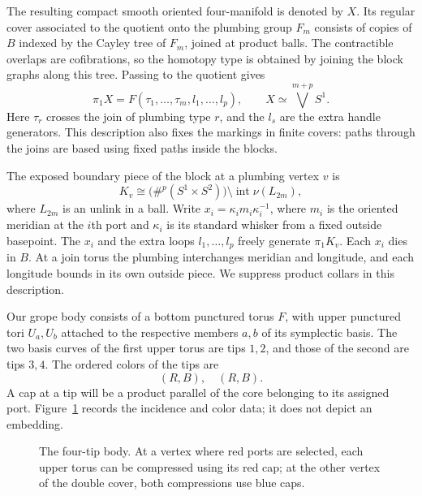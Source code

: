 The resulting compact smooth oriented four-manifold is denoted by $X$.
Its regular cover associated to the quotient onto the plumbing group
$F_m$ consists of copies of $B$ indexed by the Cayley tree of $F_m$,
joined at product balls.  The contractible overlaps are cofibrations,
so the homotopy type is obtained by joining the block graphs along
this tree.  Passing to the quotient gives
\begin{equation}
\label{ch:plumbing-group}
 \pi_1X=F(\tau_1,\ldots,\tau_m,l_1,\ldots,l_p),
 \qquad X\simeq\bigvee^{m+p}S^1.
\end{equation}
Here $\tau_r$ crosses the join of plumbing type $r$, and the $l_s$ are
the extra handle generators.  This description also fixes the markings
in finite covers: paths through the joins are based using fixed paths
inside the blocks.

The exposed boundary piece of the block at a plumbing vertex $v$ is
\begin{equation}
\label{ch:outside-piece}
 K_v\cong\bigl(\#^p(S^1\times S^2)\bigr)
       \setminus\operatorname{int}\nu(L_{2m}),
\end{equation}
where $L_{2m}$ is an unlink in a ball.  Write
$x_i=\kappa_i m_i\kappa_i^{-1}$, where $m_i$ is the oriented meridian
at the $i$th port and $\kappa_i$ is its standard whisker from a fixed
outside basepoint.  The $x_i$ and the extra loops
$l_1,\ldots,l_p$ freely generate $\pi_1K_v$.  Each $x_i$ dies in $B$.
At a join torus the plumbing interchanges meridian and longitude, and
each longitude bounds in its own outside piece.  We suppress product
collars in this description.

Our grope body consists of a bottom punctured torus $F$, with upper
punctured tori $U_a,U_b$ attached to the respective members $a,b$ of
its symplectic basis.
The two basis curves of the first upper torus are tips $1,2$, and those
of the second are tips $3,4$.  The ordered colors of the tips are
\[
 (R,B),\quad(R,B).
\]
A cap at a tip will be a product parallel of the core belonging to its
assigned port.  Figure~\ref{ch:grope-figure} records the incidence and
color data; it does not depict an embedding.

\begin{figure}[ht]
\centering
{}
\caption{The four-tip body.  At a vertex where red ports are selected,
each upper torus can be compressed using its red cap; at the other
vertex of the double cover, both compressions use blue caps.}
\label{ch:grope-figure}
\end{figure}


